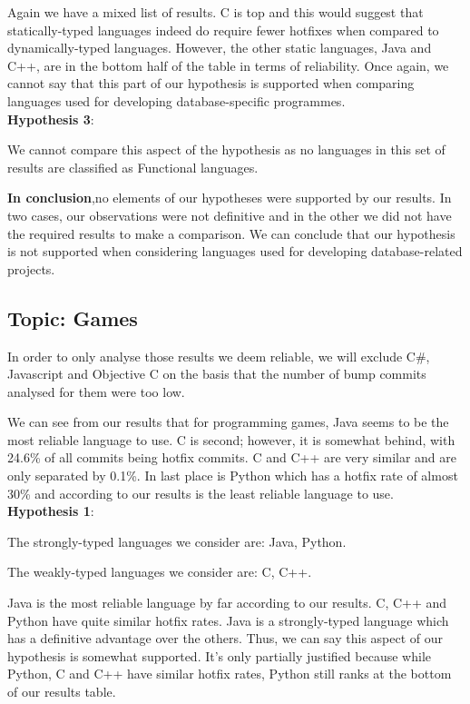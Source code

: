 Again we have a mixed list of results. C is top and this would suggest that statically-typed languages indeed do require fewer hotfixes when compared to dynamically-typed languages. However, the other static languages, Java and C++, are in the bottom half of the table in terms of reliability. Once again, we cannot say that this part of our hypothesis is supported when comparing languages used for developing database-specific programmes.\\

\textbf{Hypothesis 3}:\par
We cannot compare this aspect of the hypothesis as no languages in this set of results are classified as Functional languages.\par
\textbf{In conclusion},no elements of our hypotheses were supported by our results. In two cases, our observations were not definitive and in the other we did not have the required results to make a comparison. We can conclude that our hypothesis is not supported when considering languages used for developing  database-related projects.

\subsection{Topic: Games}
In order to only analyse those results we deem reliable, we will exclude C\#, Javascript and Objective C on the basis that the number of bump commits analysed for them were too low.\par

We can see from our results that for programming games, Java seems to be the most reliable language to use. C is second; however, it is somewhat behind, with 24.6\% of all commits being hotfix commits. C and C++ are very similar and are only separated by 0.1\%. In last place is Python which has a hotfix rate of almost 30\% and according to our results is the least reliable language to use.\\

\textbf{Hypothesis 1}:\par
The strongly-typed languages we consider are: Java, Python.\par
The weakly-typed languages we consider are: C, C++.\par

Java is the most reliable language by far according to our results. C, C++ and Python have quite similar hotfix rates. Java is a strongly-typed language which has a definitive advantage over the others. Thus, we can say this aspect of our hypothesis is somewhat supported. It's only partially justified because while Python, C and C++ have similar hotfix rates, Python still ranks at the bottom of our results table.\\

